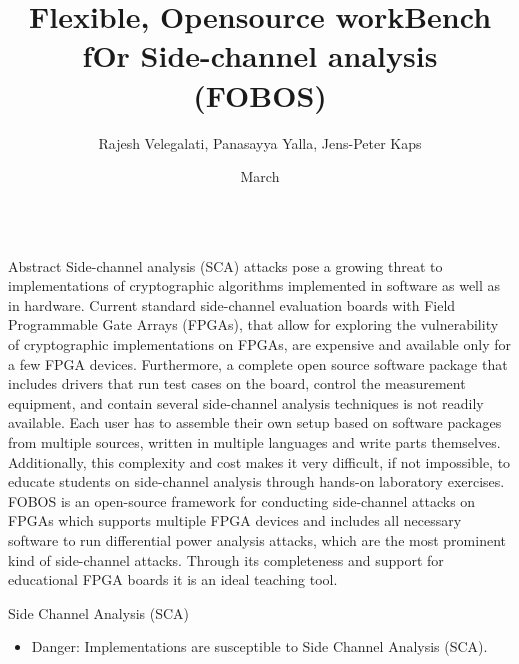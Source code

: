 \documentclass[xcolor=pdftex,dvipsnames,table,final]{beamer}
\title{\LARGE Flexible, Opensource workBench fOr Side-channel analysis\\ \vspace{0.5ex}(FOBOS)}
\author{Rajesh Velegalati, Panasayya Yalla, Jens-Peter Kaps}%
\institute{\vspace{-1ex}Department of Electrical and Computer Engineering, George Mason University, Fairfax, Virginia 22030, USA
          } %
\date{March}
\begin{document}
\begin{frame}[fragile]{} 
  \begin{columns}[t]
    \begin{column}{.31\linewidth}

      \begin{block}{Abstract}
Side-channel analysis (SCA) attacks pose a growing threat to implementations of cryptographic 
algorithms implemented in software as well as in hardware. Current standard 
side-channel evaluation boards with Field Programmable Gate Arrays (FPGAs), that allow 
for exploring the vulnerability of cryptographic implementations on FPGAs, are expensive
and available only for a few FPGA devices. Furthermore, a complete open source 
software package that includes drivers that run test cases on the board, 
control the measurement equipment, and contain several side-channel analysis 
techniques is not readily available. Each user has to assemble their own setup
based on software packages from multiple sources, written in multiple languages
and write parts themselves. Additionally, this complexity and cost makes it very difficult,
if not impossible, to educate students on side-channel analysis
through hands-on laboratory exercises. 
FOBOS is an open-source framework for conducting side-channel attacks on FPGAs
which supports multiple FPGA devices and includes all necessary software to run 
differential power analysis attacks, which are the most prominent kind of side-channel attacks. 
Through its completeness and support for educational FPGA boards it is an ideal 
teaching tool.
      \end{block}
	 

      \begin{block}{Side Channel Analysis (SCA)}
          \vspace{-1ex}
        \begin{itemize}
          \item {\color{red}Danger:} Implementations are susceptible to Side Channel Analysis (SCA).
        \end{itemize}


\end{block}
\end{column}
\end{columns}
\end{frame}
\end{document}
